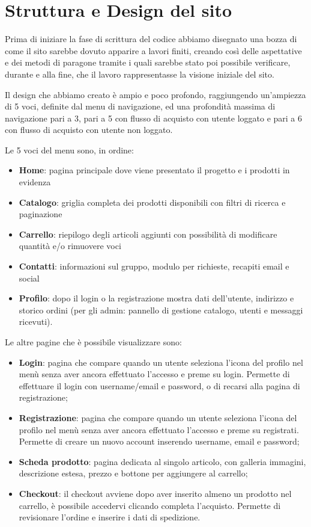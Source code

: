 \documentclass[11pt,a4paper]{article}
\begin{document}
\section{Struttura e Design del sito}

Prima di iniziare la fase di scrittura del codice abbiamo disegnato una bozza di come il sito sarebbe dovuto apparire a lavori finiti, creando cos\`i delle aspettative e dei metodi di paragone tramite i quali sarebbe stato poi possibile verificare, durante e alla fine, che il lavoro rappresentasse la visione iniziale del sito.

Il design che abbiamo creato \`e ampio e poco profondo, raggiungendo un'ampiezza di 5 voci, definite dal menu di navigazione, ed una profondit\`a massima di navigazione pari a 3, pari a 5 con flusso di acquisto con utente loggato e pari a 6 con flusso di acquisto con utente non loggato.

Le 5 voci del menu sono, in ordine:
\begin{itemize}
  \item \textbf{Home}: pagina principale dove viene presentato il progetto e i prodotti in evidenza
  \item \textbf{Catalogo}: griglia completa dei prodotti disponibili con filtri di ricerca e paginazione
  \item \textbf{Carrello}: riepilogo degli articoli aggiunti con possibilit\`a di modificare quantit\`a e/o rimuovere voci
  \item \textbf{Contatti}: informazioni sul gruppo, modulo per richieste, recapiti email e social
  \item \textbf{Profilo}: dopo il login o la registrazione mostra dati dell'utente, indirizzo e storico ordini (per gli admin: pannello di gestione catalogo, utenti e messaggi ricevuti).
\end{itemize}

Le altre pagine che \`e possibile visualizzare sono:
\begin{itemize}
  \item \textbf{Login}: pagina che compare quando un utente seleziona l'icona del profilo nel men\`u senza aver ancora effettuato l'accesso e preme su login. Permette di effettuare il login con username/email e password, o di recarsi alla pagina di registrazione;
  \item \textbf{Registrazione}: pagina che compare quando un utente seleziona l'icona del profilo nel men\`u senza aver ancora effettuato l'accesso e preme su registrati. Permette di creare un nuovo account inserendo username, email e password;
  \item \textbf{Scheda prodotto}: pagina dedicata al singolo articolo, con galleria immagini, descrizione estesa, prezzo e bottone per aggiungere al carrello;
  \item \textbf{Checkout}: il checkout avviene dopo aver inserito almeno un prodotto nel carrello, è possibile accedervi clicando completa l'acquisto. Permette di revisionare l'ordine e inserire i dati di spedizione.
\end{itemize}
\end{document}
